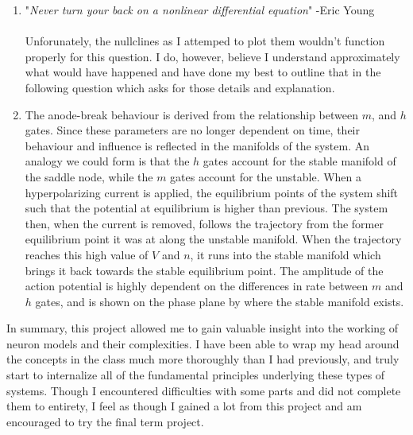 \documentclass[10pt]{report}
\begin{document}
\begin{enumerate}
%
%
\item "\emph{Never turn your back on a nonlinear differential equation}" -Eric Young \\ \\ Unforunately, the nullclines as I attemped to plot them wouldn't function properly for this question. I do, however, believe I understand approximately what would have happened and have done my best to outline that in the following question which asks for those details and explanation.
%
%
\item The anode-break behaviour is derived from the relationship between $m$, and $h$ gates. Since these parameters are no longer dependent on time, their behaviour and influence is reflected in the manifolds of the system. An analogy we could form is that the $h$ gates account for the stable manifold of the saddle node, while the $m$ gates account for the unstable. When a hyperpolarizing current is applied, the equilibrium points of the system shift such that the potential at equilibrium is higher than previous. The system then, when the current is removed, follows the trajectory from the former equilibrium point it was at along the unstable manifold. When the trajectory reaches this high value of $V$ and $n$, it runs into the stable manifold which brings it back towards the stable equilibrium point. The amplitude of the action potential is highly dependent on the differences in rate between $m$ and $h$ gates, and is shown on the phase plane by where the stable manifold exists.
\end{enumerate}
In summary, this project allowed me to gain valuable insight into the working of neuron models and their complexities. I have been able to wrap my head around the concepts in the class much more thoroughly than I had previously, and truly start to internalize all of the fundamental principles underlying these types of systems. Though I encountered difficulties with some parts and did not complete them to entirety, I feel as though I gained a lot from this project and am encouraged to try the final term project.
\pagebreak



\end{document}
